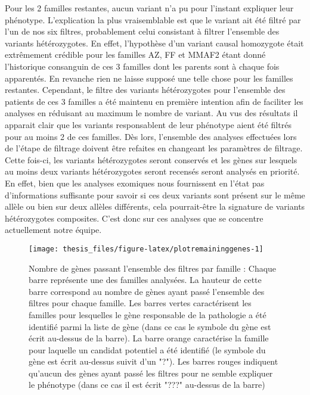 \documentclass[12pt,twoside]{reedthesis}
\theoremstyle{definition}
\theoremstyle{definition}
\theoremstyle{remark}
\begin{document}
  Pour les 2 familles restantes, aucun variant n'a pu pour l'instant
  expliquer leur phénotype. L'explication la plus vraisemblable est que le
  variant ait été filtré par l'un de nos six filtres, probablement celui
  consistant à filtrer l'ensemble des variants hétérozygotes. En effet,
  l'hypothèse d'un variant causal homozygote était extrêmement crédible
  pour les familles AZ, FF et MMAF2 étant donné l'historique consanguin de
  ces 3 familles dont les parents sont à chaque fois apparentés. En
  revanche rien ne laisse supposé une telle chose pour les familles
  restantes. Cependant, le filtre des variants hétérozygotes pour
  l'ensemble des patients de ces 3 familles a été maintenu en première
  intention afin de faciliter les analyses en réduisant au maximum le
  nombre de variant. Au vus des résultats il apparait clair que les
  variants responsablent de leur phénotype aient été filtrés pour au moins
  2 de ces familles. Dès lors, l'ensemble des analyses effectuées lors de
  l'étape de filtrage doivent être refaites en changeant les paramètres de
  filtrage. Cette fois-ci, les variants hétérozygotes seront conservés et
  les gènes sur lesquels au moins deux variants hétérozygotes seront
  recensés seront analysés en priorité. En effet, bien que les analyses
  exomiques nous fournissent en l'état pas d'informations suffisante pour
  savoir si ces deux variants sont présent sur le même allèle ou bien sur
  deux allèles différents, cela pourrait-être la signature de variants
  hétérozygotes composites. C'est donc sur ces analyses que se concentre
  actuellement notre équipe.
  
  \begin{figure}
  
  {\centering \texttt{[image: thesis\_files/figure-latex/plotremaininggenes-1]} 
  
  }
  
  \caption[Nombre de gènes passant l'ensemble des filtres par famille]{Nombre de gènes passant l'ensemble des filtres par famille  :  Chaque barre représente une des familles analysées. La hauteur de cette barre correspond au nombre de gènes ayant passé l'ensemble des filtres pour chaque famille. Les barres vertes caractérisent les familles pour lesquelles le gène responsable de la pathologie a été identifié parmi la liste de gène (dans ce cas le symbole du gène est écrit au-dessus de la barre). La barre orange caractérise la famille pour laquelle un candidat potentiel a été identifié (le symbole du gène est écrit au-dessus suivit d'un "?"). Les barres rouges indiquent qu'aucun des gènes ayant passé les filtres pour ne semble expliquer le phénotype (dans ce cas il est écrit "???" au-dessus de la barre)}\label{fig:plotremaininggenes}
  \end{figure}
  
\end{document}

